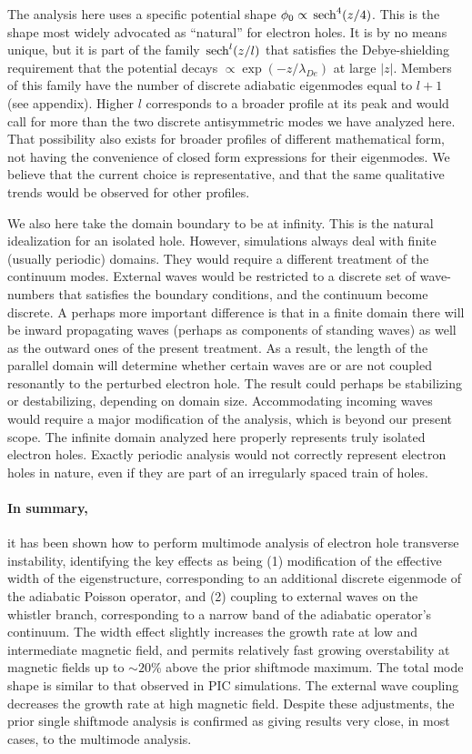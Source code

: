 \documentclass[12pt]{article}
\def\sech{{\,\rm sech}}
\begin{document}
The analysis here uses a specific potential shape
$\phi_0\propto \sech^4(z/4)$. This is the shape most widely advocated
as ``natural'' for electron holes. It is by no means unique, but it is
part of the family $\sech^l(z/l)$ that satisfies the Debye-shielding
requirement that the potential decays $\propto \exp(-z/\lambda_{De})$
at large $|z|$. Members of this family have the number of discrete
adiabatic eigenmodes equal to $l+1$ (see appendix). Higher $l$
corresponds to a broader profile at its peak and would call for more
than the two discrete antisymmetric modes we have analyzed here. That
possibility also exists for broader profiles of different mathematical
form, not having the convenience of closed form expressions for their
eigenmodes. We believe that the current choice is representative, and
that the same qualitative trends would be observed for other profiles.

We also here take the domain boundary to be at infinity. This is the
natural idealization for an isolated hole. However, simulations always
deal with finite (usually periodic) domains. They would require a
different treatment of the continuum modes. External waves would be
restricted to a discrete set of wave-numbers that satisfies the
boundary conditions, and the continuum become discrete. A perhaps more
important difference is that in a finite domain there will be inward
propagating waves (perhaps as components of standing waves) as well as
the outward ones of the present treatment. As a result, the length of
the parallel domain will determine whether certain waves are or are
not coupled resonantly to the perturbed electron hole. The result
could perhaps be stabilizing or destabilizing, depending on domain
size. Accommodating incoming waves would require a major modification of
the analysis, which is beyond our present scope. The infinite domain
analyzed here properly represents truly isolated electron
holes. Exactly periodic analysis would not correctly represent
electron holes in nature, even if they are part of an irregularly
spaced train of holes.

\paragraph{In summary,} it has been shown how to perform multimode
analysis of electron hole transverse instability, identifying the key
effects as being (1) modification of the effective width of the
eigenstructure, corresponding to an additional discrete eigenmode of
the adiabatic Poisson operator, and (2) coupling to external waves on
the whistler branch, corresponding to a narrow band of the adiabatic
operator's continuum. The width effect slightly increases the growth
rate at low and intermediate magnetic field, and permits relatively
fast growing overstability at magnetic fields up to $\sim20$\% above
the prior shiftmode maximum. The total mode shape is similar to that
observed in PIC simulations. The external wave coupling decreases the
growth rate at high magnetic field.  Despite these adjustments, the
prior single shiftmode analysis is confirmed as giving results very
close, in most cases, to the multimode analysis.
\end{document}
